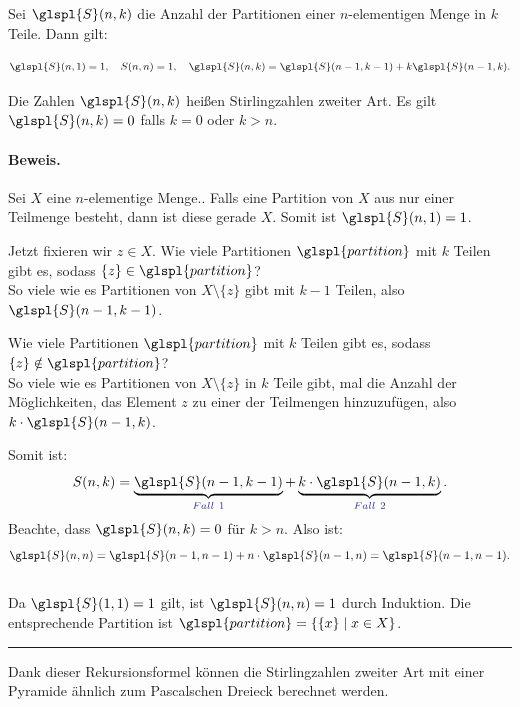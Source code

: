 \documentclass[9pt]{article}
\begin{document}
\begin{satz}
Sei \( \glspl{S}(n, k) \) die Anzahl der Partitionen einer \( n \)-elementigen Menge in \( k \) Teile. Dann gilt:

\[
\glspl{S}(n, 1) = 1, \quad S(n, n) = 1, \quad \glspl{S}(n, k) = \glspl{S}(n - 1, k - 1) + k\glspl{S}(n - 1, k).
\]

Die Zahlen \( \glspl{S}(n, k) \) heißen Stirlingzahlen zweiter Art. Es gilt \( \glspl{S}(n, k) = 0 \) falls \( k = 0 \) oder \( k > n \). \\  

\paragraph{Beweis.}
Sei \( X \) eine \( n \)-elementige Menge.. Falls eine Partition von \( X \) aus nur einer Teilmenge besteht, dann ist diese gerade \( X \). Somit ist \( \glspl{S}(n, 1) = 1 \).

Jetzt fixieren wir \( z \in X \). Wie viele Partitionen \(\glspl{partition}\) mit \( k \) Teilen gibt es, sodass \( \{z\} \in \glspl{partition} \)? \\
So viele wie es Partitionen von \( X \setminus \{z\} \) gibt mit \( k - 1 \) Teilen, also \( \glspl{S}(n - 1, k - 1) \).    

Wie viele Partitionen \( \glspl{partition} \) mit \( k \) Teilen gibt es, sodass \( \{z\} \notin \glspl{partition} \)? \\
So viele wie es Partitionen von \( X \setminus \{z\} \) in \( k \) Teile gibt, mal die Anzahl der Möglichkeiten, das Element \( z \) zu einer der Teilmengen hinzuzufügen, also \( k \cdot \glspl{S}(n - 1, k) \). 

Somit ist:
\[
S(n, k) = \underbrace{\glspl{S}(n - 1, k - 1)}_{\txc{Fall \ 1}} + \underbrace{k \cdot \glspl{S}(n - 1, k)}_{\txc{Fall \ 2}}.
\]
Beachte, dass \( \glspl{S}(n, k) = 0 \) für \( k > n \). Also ist:
\[
\glspl{S}(n, n) = \glspl{S}(n - 1, n - 1) + n \cdot \glspl{S}(n - 1, n) = \glspl{S}(n - 1, n - 1).
\]
 \\ 
Da \( \glspl{S}(1, 1) = 1 \) gilt, ist \( \glspl{S}(n, n) = 1 \) durch Induktion. Die entsprechende Partition ist \( \glspl{partition} = \{\{x\} \mid x \in X\} \).
 \end{satz} \noindent \rule{8cm}{0.4pt}
Dank dieser Rekursionsformel können die Stirlingzahlen zweiter Art mit einer Pyramide ähnlich zum Pascalschen Dreieck berechnet werden.
\end{document}
